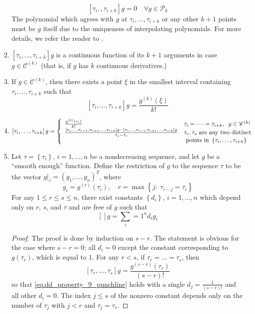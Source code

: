 \documentclass[12pt]{article}
\newcommand*\needscited{\color{orange}}
\newcommand{\PP}{\mathcal{P}}
\theoremstyle{definition}
\begin{document}
\begin{enumerate}
\[
\left[\tau_i,\dot,\tau_{i+k}\right]g = 0 \quad \forall g \in \PP_{k}
\]
The polynomial which agrees with $g$ at $\tau_i,\dots, \tau_{i+k}$ or any other $k+1$ points must be $g$ itself due to the uniqueness of interpolating polynomials. For more details, we refer the reader to {\needscited{A Practical Guide to Splines, DeBoor}}.
\item \label{eq:dd_property_6} $\left[\tau_i,\dots,\tau_{i+k} \right]g$ is a continuous function of its $k+1$ arguments in case $g\in \mathscr{C}^{\left(k\right)}$ (that is, if $g$ has $k$ continuous derivatives.)
\item \label{eq:dd_property_7} If $g\in \mathscr{C}^{\left(k\right)}$, then there exists a point $\xi$ in the smallest interval containing $\tau_i,\dots,\tau_{i+k}$ such that 
\[
\left[\tau_i,\dots,\tau_{i+k} \right]g = \frac{g^{\left(k\right)}\left(\xi\right)}{k!}
\] 
\item \label{eq:dd_property_8}\[
\left[\tau_i,\dots,\tau_{i+k} \right]g = \left\{\begin{array}{ll}
\frac{g^{\left(k\right)}\left(\tau_i\right)}{k!} & \tau_i= \dots = \tau_{i+k},\;\;g\in \mathscr{C}^{\left(k\right)} \\
\frac{\left[\tau_i,\dots,\tau_{r-1},\tau_{r+1},\dots,\tau_{i+k} \right]g-\left[\tau_i,\dots,\tau_{s-1},\tau_{s+1},\dots,\tau_{i+k} \right]g}{\tau_s-\tau_r} &  \tau_r,\tau_s \textup{ are any two distinct}\\
& \textup{  points in } \left\{\tau_i,\dots,\tau_{i+k}\right\}
\end{array} \right.
\]
\item \label{eq:dd_property_9} Let $\tau = \left\{\tau_i \right\}$, $i=1,\dots,n$ be a nondecreasing sequence, and let $g$ be a ``smooth enough'' function. Define the restriction of $g$ to the sequence $\tau$ to be the vector $g \vert_\tau = \left(g_1,\dots,g_n\right)^T$, where
\[
g_i = g^{\left(r\right)}\left(\tau_i\right),\quad r=\max\left\{j:\;\tau_{i-j}=\tau_i\right\}
\]
For any $1 \le r \le s \le n$, there exist constants $\left\{d_i \right\}$, $i=1,\dots,n$ which depend only on $r$, $s$, and $\tau$ and are free of $g$ such that 
\begin{equation} \label{eq:dd_property_9_punchline}
\left[\right]g = \sum_i=1^n d_i g_i
\end{equation}
\begin{proof}
The proof is done by induction on $s-r$. The statement is obvious for the case where $s-r=0$; all $d_i = 0$ except the constant corresponding to $g\left(\tau_r\right)$, which is equal to $1$. For any $r < s$, if $\tau_r= \dots = \tau_s$, then 
\[
\left[\tau_r,\dots, \tau_s\right]g = \frac{g^{\left(s-r\right)}\left(\tau_r\right)}{\left(s-r\right)!}
\]
so that \ref{eq:dd_property_9_punchline} holds with a single $d_j = \frac{1}{\left(s-r\right)!}$ and all other $d_i = 0$. The index $j \le s$ of the nonzero constant depends only on the number of $\tau_j$ with $j<r$ and $\tau_j = \tau_r$.


\end{proof}
\end{enumerate}
\end{document}
